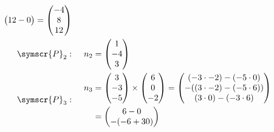 \documentclass{article}
\def\fancyP{\symscr{P}}
\begin{document}
\begin{enumerate}
\begin{enumerate}[label=\listAlph]
\[\begin{aligned}
\begin{aligned}
\begin{pmatrix}
                            12 - 0
                        \end{pmatrix}
                        =
                        \begin{pmatrix}
                            -4 \\ 8 \\ 12
                        \end{pmatrix}
                    \end{aligned}
                    \\
                    \fancyP_2:&
                    \hspace{0.5cm}
                    n_2 = \begin{pmatrix}
                        1 \\ -4 \\ 3
                    \end{pmatrix}
                    \hspace{1.5cm}
                    \\
                    \fancyP_3:&
                    \hspace{0.5cm}
                    \begin{aligned}
                        n_3 &= 
                        \begin{pmatrix}
                            3 \\ -3 \\ -5
                        \end{pmatrix}
                        \times
                        \begin{pmatrix}
                            6 \\ 0 \\ -2
                        \end{pmatrix}
                        =
                        \begin{pmatrix}
                            (-3 \cdot -2) - (-5 \cdot 0) \\
                            -( (3 \cdot -2) - (-5 \cdot 6) ) \\
                            (3 \cdot 0) - (-3 \cdot 6)
                        \end{pmatrix}
                        \\
                        &=
                        \begin{pmatrix}
                            6 - 0 \\
                            -(-6 + 30) \\

\end{pmatrix}
\end{aligned}
\end{aligned}\]
\end{enumerate}
\end{enumerate}
\end{document}
